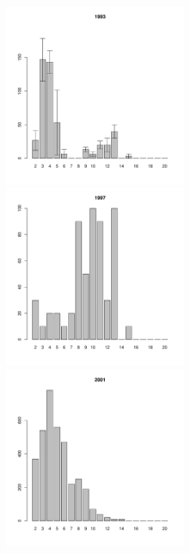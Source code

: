 \begin{figure}[hp]
\begin{minipage}[b]{.3\linewidth}
\begin{center}
	\end{center}
	\end{minipage}
	\begin{minipage}[b]{.3\linewidth}
	\begin{center}
	\includegraphics[width=60mm]{../White_Sea/Luvenga_Goreliy/middle2_1993_.pdf}
	\end{center}
	\end{minipage}
	\hfil %
	\begin{minipage}[b]{.3\linewidth}
	\begin{center}
	\includegraphics[width=60mm]{../White_Sea/Luvenga_Goreliy/middle2_1997_.pdf}
	\end{center}
	\end{minipage}
	\hfil %
	\begin{minipage}[b]{.3\linewidth}
	\begin{center}
	\includegraphics[width=60mm]{../White_Sea/Luvenga_Goreliy/middle2_2001_.pdf}
	\end{center}
	\end{minipage}



\end{figure}
